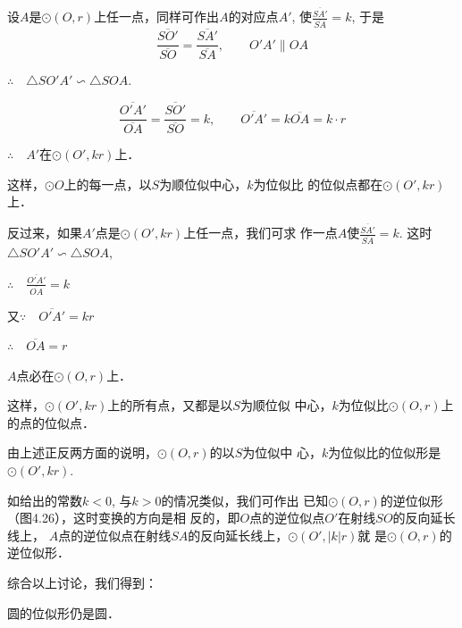 设$A$是$\odot (O,r)$上任一点，同样可作出$A$的对应点$A'$, 
使$\frac{\overline{SA'}}{\overline{SA}}=k$, 于是
\[\frac{\overline{SO'}}{\overline{SO}}=\frac{\overline{SA'}}{\overline{SA}},\qquad O'A'\parallel OA\]

$\therefore\quad \triangle SO'A'\backsim \triangle SOA$.

\[\frac{\overline{O'A'}}{\overline{OA}}=\frac{\overline{SO'}}{\overline{SO}}=k,\qquad \overline{O'A'}=k\overline{OA}=k\cdot r\]

$\therefore \quad A'$在$\odot (O',kr)$上．

这样，$\odot O$上的每一点，以$S$为顺位似中心，$k$为位似比
的位似点都在$\odot (O',kr)$上．

反过来，如果$A'$点是$\odot (O',kr)$上任一点，我们可求
作一点$A$使$\frac{\overline{SA'}}{\overline{SA}}=k$. 这时$\triangle SO'A'\backsim \triangle SOA$,

$\therefore \quad \frac{\overline{O'A'}}{\overline{OA}}=k$

又$\because\quad \overline{O'A'}=kr$

$\therefore\quad \overline{OA}=r$

$A$点必在$\odot (O,r)$上．

这样，$\odot (O',kr)$上的所有点，又都是以$S$为顺位似
中心，$k$为位似比$\odot (O,r)$上的点的位似点．

由上述正反两方面的说明，$\odot (O,r)$的以$S$为位似中
心，$k$为位似比的位似形是$\odot (O',kr)$.

如给出的常数$k<0$, 与$k>0$的情况类似，我们可作出
已知$\odot (O,r)$的逆位似形（图4.26），这时变换的方向是相
反的，即$O$点的逆位似点$O'$在射线$SO$的反向延长线上，
$A$点的逆位似点在射线$SA$的反向延长线上，$\odot (O',|k|r)$就
是$\odot (O,r)$的逆位似形．

\begin{figure}[htp]
    \centering
    \caption{}
  \end{figure}



综合以上讨论，我们得到：
\begin{blk}{}
    圆的位似形仍是圆．
\end{blk}

